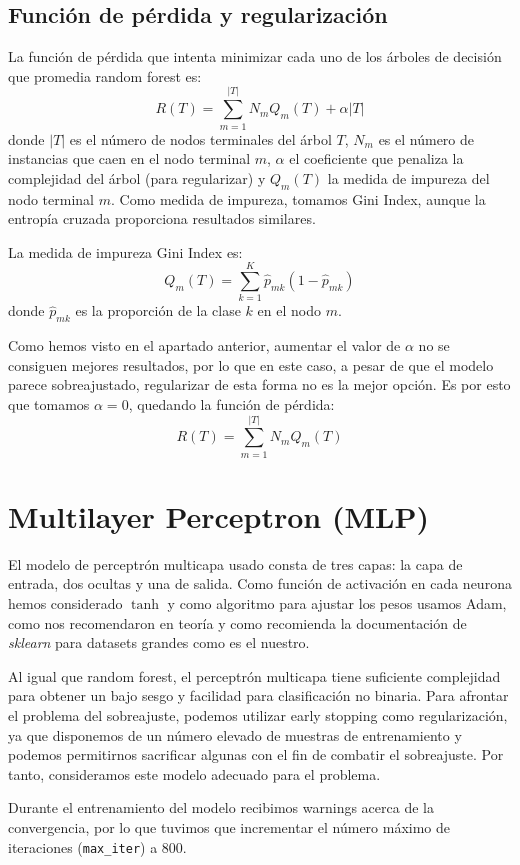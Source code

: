 \documentclass[a4]{article}
\begin{document}
\subsection{Función de pérdida y regularización}

La función de pérdida que intenta minimizar cada uno de los árboles de
decisión que promedia random forest es:
\[R(T) = \sum\limits_{m=1}^{|T|} N_mQ_m(T) + \alpha|T|\] donde $|T|$
es el número de nodos terminales del árbol $T$, $N_m$ es el número de
instancias que caen en el nodo terminal $m$, $\alpha$ el coeficiente
que penaliza la complejidad del árbol (para regularizar) y $Q_m(T)$ la
medida de impureza del nodo terminal $m$. Como medida de impureza,
tomamos Gini Index, aunque la entropía cruzada proporciona resultados
similares.

La medida de impureza Gini Index es:
\[Q_m(T) = \sum\limits_{k=1}^{K} \hat p_{mk}(1 - \hat p_{mk})\] donde
$\hat p_{mk}$ es la proporción de la clase $k$ en el nodo $m$.

Como hemos visto en el apartado anterior, aumentar el valor de
$\alpha$ no se consiguen mejores resultados, por lo que en este caso,
a pesar de que el modelo parece sobreajustado, regularizar de esta
forma no es la mejor opción. Es por esto que tomamos $\alpha = 0$,
quedando la función de pérdida:
\[R(T) = \sum\limits_{m=1}^{|T|} N_mQ_m(T)\]

\section{Multilayer Perceptron (MLP)}

El modelo de perceptrón multicapa usado consta de tres capas: la capa
de entrada, dos ocultas y una de salida. Como función de activación en
cada neurona hemos considerado $\tanh$ y como algoritmo para ajustar
los pesos usamos Adam, como nos recomendaron en teoría y como
recomienda la documentación de \textit{sklearn} para datasets grandes
como es el nuestro.

Al igual que random forest, el perceptrón multicapa tiene suficiente
complejidad para obtener un bajo sesgo y facilidad para clasificación
no binaria. Para afrontar el problema del sobreajuste, podemos
utilizar early stopping como regularización, ya que disponemos de un
número elevado de muestras de entrenamiento y podemos permitirnos
sacrificar algunas con el fin de combatir el sobreajuste. Por tanto,
consideramos este modelo adecuado para el problema.

Durante el entrenamiento del modelo recibimos warnings acerca de la convergencia, por lo que tuvimos que incrementar el número máximo de iteraciones (\texttt{max\_iter}) a $800$. 
\end{document}
